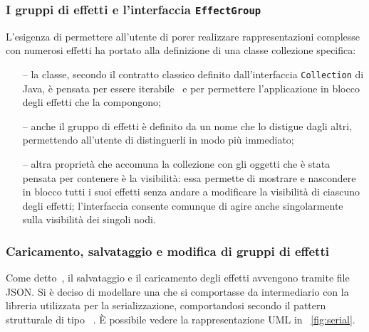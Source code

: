             \subsubsection{I gruppi di effetti e l'interfaccia \texttt{EffectGroup}}\label{subsub:effectGroup}
                L'esigenza di permettere all'utente di porer realizzare rappresentazioni complesse con numerosi effetti ha portato alla definizione di una classe collezione specifica:
                \begin{itemize}
                    \item[--]\label{itm:eFXgIterator} la classe, secondo il contratto classico definito dall'interfaccia \texttt{Collection} di Java, è pensata per essere iterabile~\cite{iterator} e per permettere l'applicazione in blocco degli effetti che la compongono;
                    \item[--]\label{itm:eFXgName} anche il gruppo di effetti è definito da un nome che lo distigue dagli altri, permettendo all'utente di distinguerli in modo più immediato;
                    \item[--]\label{itm:eFXgVis} altra proprietà che accomuna la collezione con gli oggetti che è stata pensata per contenere è la visibilità: essa permette di mostrare e nascondere in blocco tutti i suoi effetti senza andare a modificare la visibilità di ciascuno degli effetti; l'interfaccia consente comunque di agire anche singolarmente sulla visibilità dei singoli nodi.
                \end{itemize}

            \subsubsection{Caricamento, salvataggio e modifica di gruppi di effetti}\label{subsub:serializzazione}

                Come detto~, il salvataggio e il caricamento degli effetti avvengono tramite file JSON. Si è deciso di modellare una  che si comportasse da intermediario con la libreria utilizzata per la serializzazione, comportandosi secondo il pattern strutturale di tipo ~\cite{designPattern}. È possibile vedere la rappresentazione UML in \figurename~\vref{fig:serial}.

